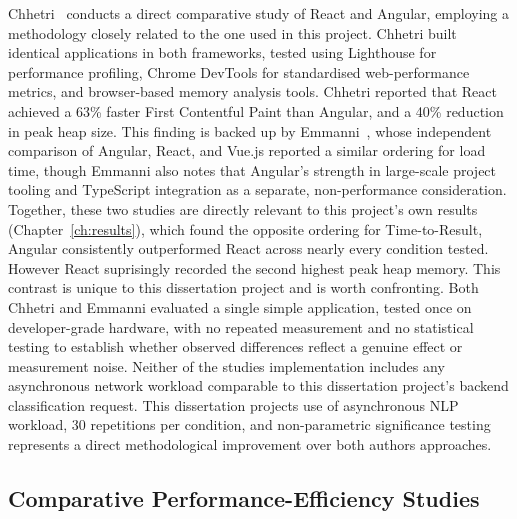 \documentclass[11pt,a4paper]{report}
\begin{document}
Chhetri~\cite{chhetri} conducts a direct comparative study of React and Angular, employing a methodology closely related to the one used in this project. Chhetri built identical applications in both frameworks, tested using Lighthouse for performance profiling, Chrome DevTools for standardised web-performance metrics, and browser-based memory analysis tools. Chhetri reported that React achieved a 63\% faster First Contentful Paint than Angular, and a 40\% reduction in peak heap size. This finding is backed up by Emmanni~\cite{emmanni}, whose independent comparison of Angular, React, and Vue.js reported a similar ordering for load time, though Emmanni also notes that Angular's strength in large-scale project tooling and TypeScript integration as a separate, non-performance consideration. Together, these two studies are directly relevant to this project's own results (Chapter~\ref{ch:results}), which found the opposite ordering for Time-to-Result, Angular consistently outperformed React across nearly every condition tested. However React suprisingly recorded the second highest peak heap memory. This contrast is unique to this dissertation project and is worth confronting. Both Chhetri and Emmanni evaluated a single simple application, tested once on developer-grade hardware, with no
repeated measurement and no statistical testing to establish whether observed differences reflect a genuine effect or measurement noise. Neither of the studies implementation includes any asynchronous network workload comparable to this dissertation project's backend classification request. This dissertation projects use of asynchronous NLP workload, 30 repetitions per condition, and non-parametric significance testing represents a direct methodological improvement over both authors approaches.

\subsection{Comparative Performance-Efficiency Studies}
\end{document}
